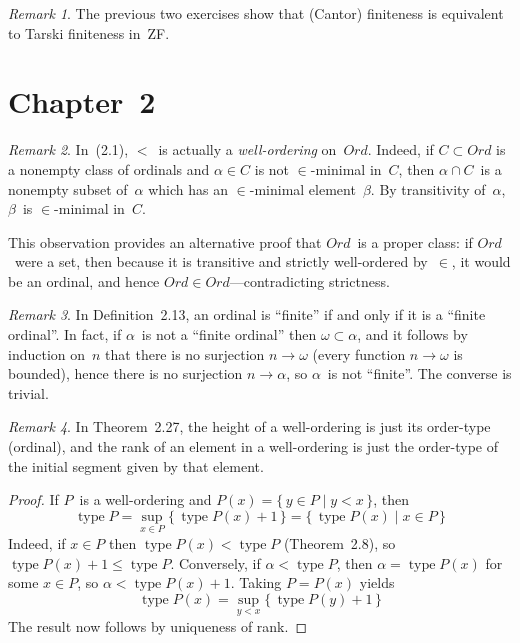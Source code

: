 \documentclass[letterpaper,12pt]{article}
\newcommand{\Ord}{\mathit{Ord}}
\newcommand{\sect}{\cap}
\DeclareMathOperator{\type}{type}
\theoremstyle{definition}
\theoremstyle{remark}
\newtheorem*{rmk}{Remark}
\begin{document}
\begin{rmk}
The previous two exercises show that (Cantor) finiteness is equivalent to Tarski finiteness in~ZF.
\end{rmk}

\section*{Chapter~2}
\begin{rmk}
In~(2.1), \(<\)~is actually a \emph{well-ordering} on~\(\Ord\). Indeed, if \(C\subset\Ord\) is a nonempty class of ordinals and \(\alpha\in C\) is not \(\in\)-minimal in~\(C\), then \(\alpha\sect C\)~is a nonempty subset of~\(\alpha\) which has an \(\in\)-minimal element~\(\beta\). By transitivity of~\(\alpha\), \(\beta\)~is \(\in\)-minimal in~\(C\).

This observation provides an alternative proof that \(\Ord\)~is a proper class: if \(\Ord\)~were a set, then because it is transitive and strictly well-ordered by~\(\in\), it would be an ordinal, and hence \(\Ord\in\Ord\)---contradicting strictness.
\end{rmk}

\begin{rmk}
In Definition~2.13, an ordinal is ``finite'' if and only if it is a ``finite ordinal''. In fact, if \(\alpha\)~is not a ``finite ordinal'' then \(\omega\subset\alpha\), and it follows by induction on~\(n\) that there is no surjection \(n\to\omega\) (every function \(n\to\omega\) is bounded), hence there is no surjection \(n\to\alpha\), so \(\alpha\)~is not ``finite''. The converse is trivial.
\end{rmk}

\begin{rmk}
In Theorem~2.27, the height of a well-ordering is just its order-type (ordinal), and the rank of an element in a well-ordering is just the order-type of the initial segment given by that element.
\end{rmk}
\begin{proof}
If \(P\)~is a well-ordering and \(P(x)=\{\,y\in P\mid y<x\,\}\), then
\[\type P=\sup_{x\in P}\{\,\type P(x)+1\,\}=\{\,\type P(x)\mid x\in P\,\}\]
Indeed, if \(x\in P\) then \(\type P(x)<\type P\) (Theorem~2.8), so \(\type P(x)+1\le\type P\). Conversely, if \(\alpha<\type P\), then \(\alpha=\type P(x)\) for some \(x\in P\), so \(\alpha<\type P(x)+1\). Taking \(P=P(x)\) yields
\[\type P(x)=\sup_{y<x}\{\,\type P(y)+1\,\}\]
The result now follows by uniqueness of rank.
\end{proof}
\end{document}
